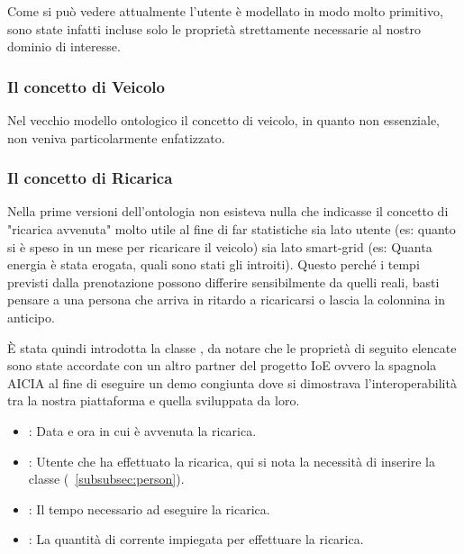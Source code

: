 \noindent
Come si può vedere attualmente l'utente è modellato in modo molto primitivo, sono state infatti incluse solo le proprietà strettamente necessarie al nostro dominio di interesse. 

\subsubsection{Il concetto di Veicolo}\label{subsubsec:vehicle}

Nel vecchio modello ontologico il concetto di veicolo, in quanto non essenziale, non veniva particolarmente enfatizzato. 



\subsubsection{Il concetto di Ricarica}

Nella prime versioni dell'ontologia non esisteva nulla che indicasse il concetto di "ricarica avvenuta" molto utile al fine di far statistiche sia lato utente (es: quanto si è speso in un mese per ricaricare il veicolo) sia lato smart-grid (es: Quanta energia è stata erogata, quali sono stati gli introiti). Questo perché i tempi previsti dalla prenotazione possono differire sensibilmente da quelli reali, basti pensare a una persona che arriva in ritardo a ricaricarsi o lascia la colonnina in anticipo. 


È stata quindi introdotta la classe , da notare che le proprietà di seguito elencate sono state accordate con un altro partner del progetto IoE ovvero la spagnola AICIA al fine di eseguire un demo congiunta dove si dimostrava l'interoperabilità tra la nostra piattaforma e quella sviluppata da loro.

\begin{itemize}
	\item {}: Data e ora in cui è avvenuta la ricarica.
	\item {}: Utente che ha effettuato la ricarica, qui si nota la necessità di inserire la classe  (~\ref{subsubsec:person}).
	\item {}: Il tempo necessario ad eseguire la ricarica.
	\item {}: La quantità di corrente impiegata per effettuare la ricarica.
\end{itemize}

